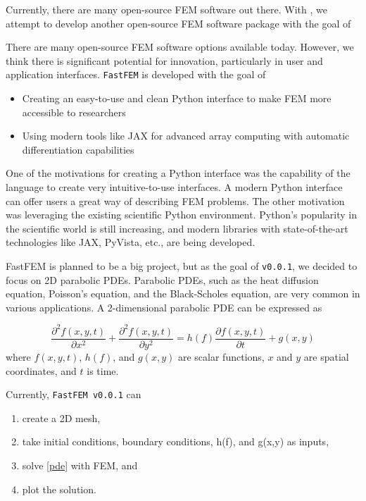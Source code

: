 \documentclass[headings=standardclasses, abstract=true]{scrartcl}
\begin{document}
Currently, there are many open-source FEM software out there. With , we attempt to develop another open-source FEM software package with the goal of

There are many open-source FEM software options available today\supercite{fem_getdp, fem_agros, fem_calculix, fem_elmerfem, fem_freefem, fem_goma, fem_fenicsx, fem_dealii}. However, we think there is significant potential for innovation, particularly in user and application interfaces. \texttt{FastFEM}\supercite{fastfem} is developed with the goal of

\begin{itemize}
    \item Creating an easy-to-use and clean Python interface to make FEM more accessible to researchers
    \item Using modern tools like JAX\supercite{jax2018github} for advanced array computing with automatic differentiation capabilities
\end{itemize}

One of the motivations for creating a Python interface was the capability of the language to create very intuitive-to-use interfaces. A modern Python interface can offer users a great way of describing FEM problems. The other motivation was leveraging the existing scientific Python environment. Python's popularity in the scientific world is still increasing, and modern libraries with state-of-the-art technologies like JAX, PyVista\supercite{Sullivan2019}, etc., are being developed.


FastFEM is planned to be a big project, but as the goal of \texttt{v0.0.1}, we decided to focus on 2D parabolic PDEs. Parabolic PDEs, such as the heat diffusion equation, Poisson's equation, and the Black-Scholes equation, are very common in various applications. A 2-dimensional parabolic PDE can be expressed as

\begin{equation}
    \frac{\partial^2 f(x,y,t)}{\partial x^2} + \frac{\partial^2 f(x,y,t)}{\partial y^2}
    =
    h(f) \frac{\partial f(x,y,t)}{\partial t} + g(x,y)
    \label{pde}
\end{equation}
where $f(x,y,t)$, $h(f)$, and $g(x,y)$ are scalar functions, $x$ and $y$ are spatial coordinates, and $t$ is time.

Currently, \texttt{FastFEM v0.0.1} can
\begin{enumerate}
    \item create a 2D mesh,
    \item take initial conditions, boundary conditions, h(f), and g(x,y) as inputs,
    \item solve \autoref{pde} with FEM, and
    \item plot the solution.
\end{enumerate}
\end{document}
